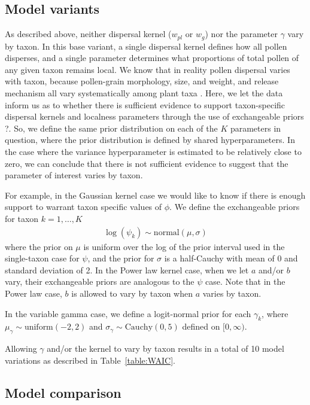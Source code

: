 \documentclass[12pt]{article}
\begin{document}
\subsection{Model variants}

As described above, neither dispersal kernel ($w_{pl}$ or $w_g$) nor
the parameter $\gamma$ vary by taxon. In this base variant, a single
dispersal kernel defines how all pollen disperses, and a single
parameter determines what proportions of total pollen of any given
taxon remains local. We know that in reality pollen dispersal varies
with taxon, because pollen-grain morphology, size, and weight, and
release mechanism all vary systematically among plant taxa
\citep{jackson1999pollen}. Here, we let the data inform us as to
whether there is sufficient evidence to support taxon-specific
dispersal kernels and localness parameters through the use of
exchangeable priors ?. So, we define the same prior distribution on
each of the $K$ parameters in question, where the prior distribution
is defined by shared hyperparameters. In the case where the variance
hyperparameter is estimated to be relatively close to zero, we can
conclude that there is not sufficient evidence to suggest that the
parameter of interest varies by taxon.

For example, in the Gaussian kernel case we would like to know
if there is enough support to warrant taxon specific values of
$\phi$. We define the exchangeable priors for taxon $k=1, \ldots, K$
\begin{align}
\log(\psi_k) \sim \text{normal}( \mu, \sigma)
\end{align}
where the prior on $\mu$ is uniform over the log of the prior interval
used in the single-taxon case for $\psi$, and the prior for $\sigma$
is a half-Cauchy with mean of 0 and standard deviation of 2. In the
Power law kernel case, when we let $a$ and/or $b$ vary, their
exchangeable priors are analogous to the $\psi$ case. Note that in the
Power law case, $b$ is allowed to vary by taxon when $a$ varies by taxon.

In the variable gamma case, we define a logit-normal prior for each
$\gamma_k$, where $\mu_{\gamma} \sim \text{uniform}(-2, 2)$ and $\sigma_{\gamma}
\sim \text{Cauchy}(0,5)$ defined on $[0,\infty)$.

Allowing $\gamma$ and/or the kernel to vary by taxon results in a
total of 10 model variations as described in Table~\ref{table:WAIC}.

\subsection{Model comparison}
\end{document}
